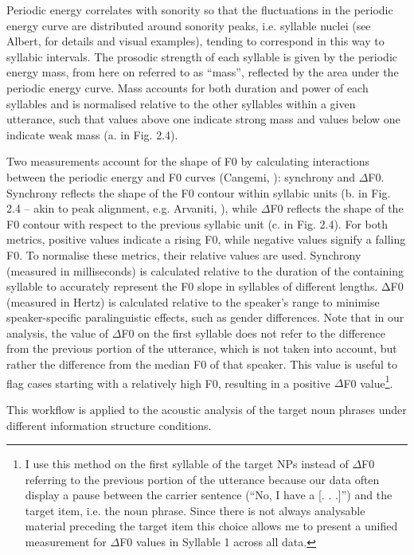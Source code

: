 Periodic energy correlates with sonority so that the fluctuations in the periodic energy curve are distributed around sonority peaks, i.e. syllable nuclei (see Albert, \citealt{CangemiGrice2018} for details and visual examples), tending to correspond in this way to syllabic intervals. The prosodic strength of each syllable is given by the periodic energy mass, from here on referred to as “mass”, reflected by the area under the periodic energy curve. Mass accounts for both duration and power of each syllables and is normalised relative to the other syllables within a given utterance, such that values above one indicate strong mass and values below one indicate weak mass (a. in Fig. 2.4).

Two measurements account for the shape of F0 by calculating interactions between the periodic energy and F0 curves (Cangemi, \citealt{AlbertGrice2019}): synchrony and ${\Delta}$F0. Synchrony reflects the shape of the F0 contour within syllabic units (b. in Fig. 2.4 – akin to peak alignment, e.g. Arvaniti, \citealt{LaddMennen2006}), while ${\Delta}$F0 reflects the shape of the F0 contour with respect to the previous syllabic unit (c. in Fig. 2.4). For both metrics, positive values indicate a rising F0, while negative values signify a falling F0. To normalise these metrics, their relative values are used. Synchrony (measured in milliseconds) is calculated relative to the duration of the containing syllable to accurately represent the F0 slope in syllables of different lengths. ΔF0 (measured in Hertz) is calculated relative to the speaker's range to minimise speaker-specific paralinguistic effects, such as gender differences. Note that in our analysis, the value of ${\Delta}$F0 on the first syllable does not refer to the difference from the previous portion of the utterance, which is not taken into account, but rather the difference from the median F0 of that speaker. This value is useful to flag cases starting with a relatively high F0, resulting in a positive ${\Delta}$F0 value\footnote{I use this method on the first syllable of the target NPs instead of ${\Delta}$F0 referring to the previous portion of the utterance because our data often display a pause between the carrier sentence (“No, I have a [. . .]”) and the target item, i.e. the noun phrase. Since there is not always analysable material preceding the target item this choice allows me to present a unified measurement for ${\Delta}$F0 values in Syllable 1 across all data.}. 

This workflow is applied to the acoustic analysis of the target noun phrases under different information structure conditions. 

